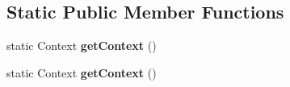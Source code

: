 \subsection*{Static Public Member Functions}
\begin{DoxyCompactItemize}
\item 
\mbox{\label{classorg_1_1cocos2dx_1_1lib_1_1Cocos2dxActivity_a9947a75d2d66287852d09df13052d912}} 
static Context {\bfseries get\+Context} ()
\item 
\mbox{\label{classorg_1_1cocos2dx_1_1lib_1_1Cocos2dxActivity_a9947a75d2d66287852d09df13052d912}} 
static Context {\bfseries get\+Context} ()
\end{DoxyCompactItemize}
